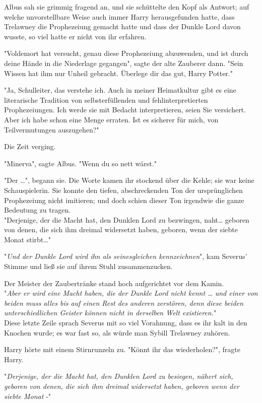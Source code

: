 {Albus sah sie grimmig fragend an, und sie schüttelte den Kopf als Antwort; auf welche unvorstellbare Weise auch immer Harry herausgefunden hatte, dass Trelawney die Prophezeiung gemacht hatte und dass der Dunkle Lord davon wusste, so viel hatte er nicht von ihr erfahren.

"Voldemort hat versucht, genau diese Prophezeiung abzuwenden, und ist durch deine Hände in die Niederlage gegangen", sagte der alte Zauberer dann. "Sein Wissen hat ihm nur Unheil gebracht. Überlege dir das gut, Harry Potter."

"Ja, Schulleiter, das verstehe ich. Auch in meiner Heimatkultur gibt es eine literarische Tradition von selbsterfüllenden und fehlinterpretierten Prophezeiungen. Ich werde sie mit Bedacht interpretieren, seien Sie versichert. Aber ich habe schon eine Menge erraten. Ist es sicherer für mich, von Teilvermutungen auszugehen?"

Die Zeit verging.

"Minerva", sagte Albus. "Wenn du so nett wärst."

"Der …", begann sie. Die Worte kamen ihr stockend über die Kehle; sie war keine Schauspielerin. Sie konnte den tiefen, abschreckenden Ton der ursprünglichen Prophezeiung nicht imitieren; und doch schien dieser Ton irgendwie die ganze Bedeutung zu tragen.\\ "Derjenige, der die Macht hat, den Dunklen Lord zu bezwingen, naht… geboren von denen, die sich ihm dreimal widersetzt haben, geboren, wenn der siebte Monat stirbt…"

"\emph{Und der Dunkle Lord wird ihn als seinesgleichen kennzeichnen}", kam Severus' Stimme und ließ sie auf ihrem Stuhl zusammenzucken.

Der Meister der Zaubertränke stand hoch aufgerichtet vor dem Kamin.\\ "\emph{Aber er wird eine Macht haben, die der Dunkle Lord nicht kennt … und einer von beiden muss alles bis auf einen Rest des anderen zerstören, denn diese beiden unterschiedlichen Geister können nicht in derselben Welt existieren.}"\\ Diese letzte Zeile sprach Severus mit so viel Vorahnung, dass es ihr kalt in den Knochen wurde; es war fast so, als würde man Sybill Trelawney zuhören.

Harry hörte mit einem Stirnrunzeln zu. "Könnt ihr das wiederholen?", fragte Harry.

"\emph{Derjenige, der die Macht hat, den Dunklen Lord zu besiegen, nähert sich, geboren von denen, die sich ihm dreimal widersetzt haben, geboren wenn der siebte Monat} -"

}
